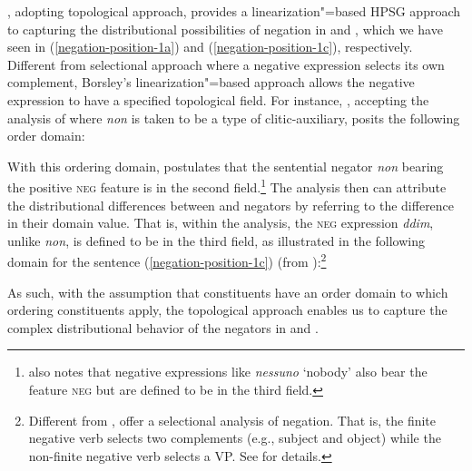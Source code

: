 \documentclass[output=paper
	        ,collection
	        ,collectionchapter
 	        ,biblatex
                ,babelshorthands
                ,newtxmath
                ,draftmode
                ,colorlinks, citecolor=brown
]{langscibook}
\begin{document}
\begin{exe}
\begin{xlist}
\citet{Borsley:06}, adopting  topological approach,
 provides a linearization"=based HPSG approach to capturing the distributional possibilities of negation in  and , which we have seen
 in (\ref{negation-position-1a}) and (\ref{negation-position-1c}), respectively.
%
%
  Different from  selectional
  approach where a negative expression selects its own complement,
  Borsley's linearization"=based approach allows the negative expression to
   have a specified topological field.
For instance, \citet{Borsley:06}, accepting the analysis of \citet{Kim:00}
where \textit{non} is taken to be a type of clitic-auxiliary, posits the following
order domain:


\ea
{}
\z
%
With this ordering domain, \citet{Borsley:06} postulates
that the  sentential negator \emph{non} bearing the positive \textsc{neg} feature is in the second field.\footnote{
\citet{Borsley:06} also notes that  negative expressions like \emph{nessuno} `nobody' also bear the feature \textsc{neg}
but are defined to be in the third field.}
The analysis then can attribute the distributional differences between  and  negators
by referring to the difference in their domain value. That is,
within the analysis, the  \textsc{neg} expression \emph{ddim}, unlike  \emph{non},
is defined to be in the third field, as illustrated in the following domain for the sentence (\ref{negation-position-1c}) (from
\citealt{Borsley:06}):\footnote{Different from \citet{Borsley:06}, \citet{BJ:00} offer  a selectional analysis of  negation.
That is, the finite negative verb selects
two complements (e.g., subject and object) while
the non-finite negative verb selects a VP. See \citet{BJ:00} for details.}

\ea
{}
\z
As such,  with the assumption that
constituents have an order domain to which ordering constituents
apply, the topological approach enables us to capture the complex distributional
behavior of the negators in  and .
%


\end{xlist}
\end{exe}
\end{document}
